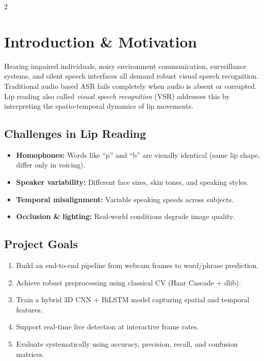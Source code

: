 \documentclass[10pt, a4paper]{article}
\begin{document}
\raggedcolumns
\begin{multicols}{2}

\section{Introduction \& Motivation}

Hearing impaired individuals, noisy environment communication, surveillance
systems, and silent speech interfaces all demand robust visual speech
recognition. Traditional audio based ASR fails completely when audio is
absent or corrupted. Lip reading also called \textit{visual speech
recognition} (VSR) addresses this by interpreting the spatio-temporal
dynamics of lip movements.

\subsection{Challenges in Lip Reading}
\begin{itemize}
  \item \textbf{Homophones:} Words like ``p'' and ``b'' are visually identical
        (same lip shape, differ only in voicing).
  \item \textbf{Speaker variability:} Different face sizes, skin tones, and
        speaking styles.
  \item \textbf{Temporal misalignment:} Variable speaking speeds across subjects.
  \item \textbf{Occlusion \& lighting:} Real-world conditions degrade image quality.
\end{itemize}

\subsection{Project Goals}
\begin{enumerate}
  \item Build an end-to-end pipeline from webcam frames to word/phrase prediction.
  \item Achieve robust preprocessing using classical CV (Haar Cascade + dlib).
  \item Train a hybrid 3D CNN + BiLSTM model capturing spatial and temporal features.
  \item Support real-time live detection at interactive frame rates.
  \item Evaluate systematically using accuracy, precision, recall, and confusion matrices.
\end{enumerate}


\end{multicols}
\end{document}

